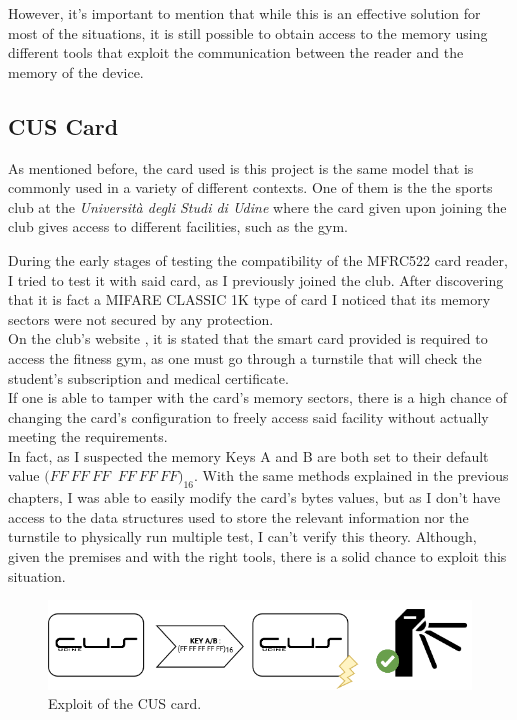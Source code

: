 \documentclass[target=bach,aauheader=,style=]{thud}
\begin{document}
However, it's important to mention that while this is an effective solution for most of the situations, it is still possible to obtain access to the memory using different tools that exploit the communication between the reader and the memory of the device.
\newpage
\subsection{CUS Card}
As mentioned before, the card used is this project is the same model that is commonly used in a variety of different contexts. One of them is the the sports club at the \emph{Università degli Studi di Udine} where the card given upon joining the club gives access to different facilities, such as the gym.

During the early stages of testing the compatibility of the MFRC522 card reader, I tried to test it with said card, as I previously joined the club.
After discovering that it is fact a MIFARE CLASSIC 1K type of card I noticed that its memory sectors were not secured by any protection.\\
On the club's website \cite{cusUdine}, it is stated that the smart card provided is required to access the fitness gym, as one must go through a turnstile that will check the student's subscription and medical certificate.\\
If one is able to tamper with the card's memory sectors, there is a high chance of changing the card's configuration to freely access said facility without actually meeting the requirements.\\
In fact, as I suspected the memory Keys A and B are both set to their default value $(FF\ FF\ FF\ $ $ FF\ FF\ FF)_{16}$. With the same methods explained in the previous chapters, I was able to easily modify the card's bytes values, but as I don't have access to the data structures used to store the relevant information nor the turnstile to physically run multiple test, I can't verify this theory. Although, given the premises and with the right tools, there is a solid chance to exploit this situation.

\begin{figure}[h!]
\centering
\includegraphics[scale=0.6]{cuscard} 
\caption{Exploit of the CUS card.}
\label{fig:cuscardhack}
\end{figure}
\end{document}

